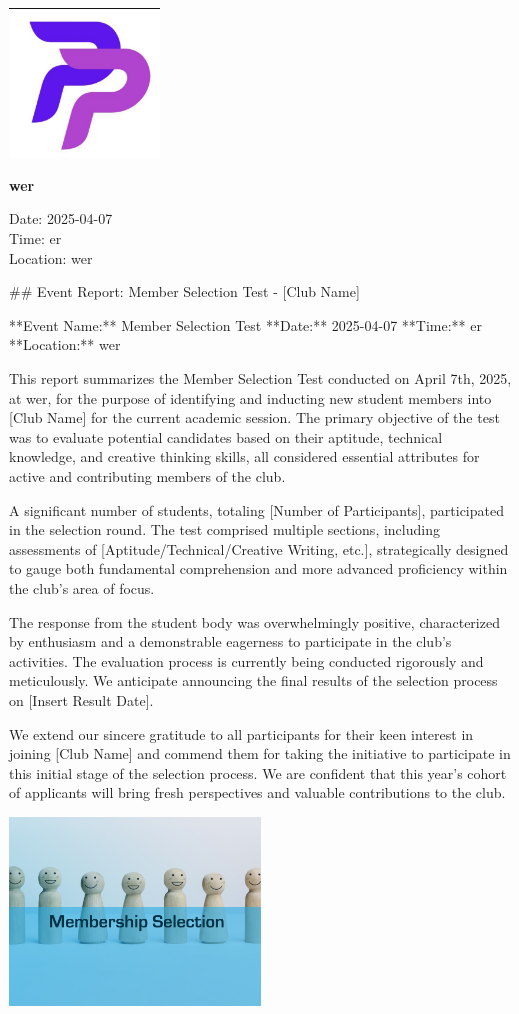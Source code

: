 \documentclass{article}
\begin{document}
\begin{center}
    \includegraphics[width=0.3\textwidth]{logo.png}
    \vspace{0.5cm}

   \LARGE \textbf{wer}

    \vspace{0.3cm}
    \normalsize Date: 2025-04-07 \\
    Time: er \\
    Location: wer
\end{center}

\vspace{1cm}

\#\# Event Report: Member Selection Test - [Club Name]

**Event Name:** Member Selection Test
**Date:** 2025-04-07
**Time:** er
**Location:** wer

This report summarizes the Member Selection Test conducted on April 7th, 2025, at wer, for the purpose of identifying and inducting new student members into [Club Name] for the current academic session. The primary objective of the test was to evaluate potential candidates based on their aptitude, technical knowledge, and creative thinking skills, all considered essential attributes for active and contributing members of the club.

A significant number of students, totaling [Number of Participants], participated in the selection round. The test comprised multiple sections, including assessments of [Aptitude/Technical/Creative Writing, etc.], strategically designed to gauge both fundamental comprehension and more advanced proficiency within the club's area of focus.

The response from the student body was overwhelmingly positive, characterized by enthusiasm and a demonstrable eagerness to participate in the club's activities. The evaluation process is currently being conducted rigorously and meticulously. We anticipate announcing the final results of the selection process on [Insert Result Date].

We extend our sincere gratitude to all participants for their keen interest in joining [Club Name] and commend them for taking the initiative to participate in this initial stage of the selection process. We are confident that this year's cohort of applicants will bring fresh perspectives and valuable contributions to the club.

\vspace{1cm}
\begin{center}
    \includegraphics[width=0.5\textwidth]{photo_1.jpg}
\end{center}
\end{document}
